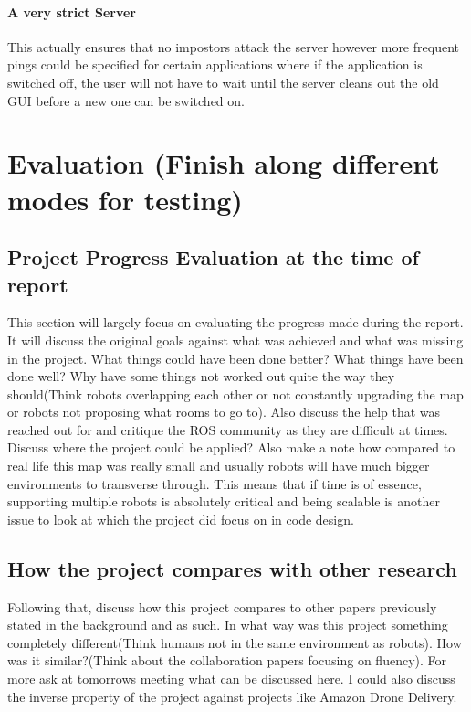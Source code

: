 \documentclass{report}
\begin{document}
      \subsubsection{A very strict Server}
        This actually ensures that no impostors attack the server however more frequent pings could be specified for certain applications where if the application is switched off, the user will not have to wait until the server cleans out the old GUI before a new one can be switched on.
  \chapter{Evaluation (Finish along different modes for testing)}
    \section{Project Progress Evaluation at the time of report}
      This section will largely focus on evaluating the progress made during the report. It will discuss the original goals against what was achieved and what was missing in the project. What things could have been done better? What things have been done well? Why have some things not worked out quite the way they should(Think robots overlapping each other or not constantly upgrading the map or robots not proposing what rooms to go to). Also discuss the help that was reached out for and critique the ROS community as they are difficult at times. Discuss where the project could be applied? Also make a note how compared to real life this map was really small and usually robots will have much bigger environments to transverse through. This means that if time is of essence, supporting multiple robots is absolutely critical and being scalable is another issue to look at which the project did focus on in code design.

    \section{How the project compares with other research}
      Following that, discuss how this project compares to other papers previously stated in the background and as such. In what way was this project something completely different(Think humans not in the same environment as robots). How was it similar?(Think about the collaboration papers focusing on fluency). For more ask at tomorrows meeting what can be discussed here. I could also discuss the inverse property of the project against projects like Amazon Drone Delivery.
\end{document}
